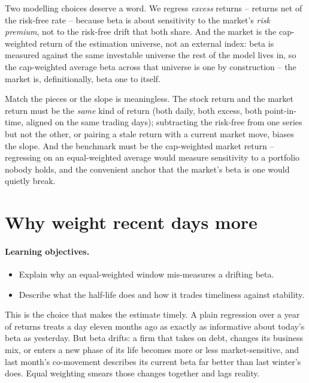 \documentclass[11pt]{article}
\theoremstyle{definition}
\theoremstyle{plain}
\theoremstyle{remark}
\begin{document}
Two modelling choices deserve a word. We regress \emph{excess} returns -- returns net of the risk-free rate -- because beta is about sensitivity to the market's \emph{risk premium}, not to the risk-free drift that both share. And the market is the cap-weighted return of the estimation universe, not an external index: beta is measured against the same investable universe the rest of the model lives in, so the cap-weighted average beta across that universe is one by construction -- the market is, definitionally, beta one to itself.

\begin{pitfall}
Match the pieces or the slope is meaningless. The stock return and the market return must be the \emph{same} kind of return (both daily, both excess, both point-in-time, aligned on the same trading days); subtracting the risk-free from one series but not the other, or pairing a stale return with a current market move, biases the slope. And the benchmark must be the cap-weighted market return -- regressing on an equal-weighted average would measure sensitivity to a portfolio nobody holds, and the convenient anchor that the market's beta is one would quietly break.
\end{pitfall}

\section{Why weight recent days more}\label{sec:halflife}

\paragraph{Learning objectives.}
\begin{itemize}[leftmargin=1.4em,topsep=2pt]
  \item Explain why an equal-weighted window mis-measures a drifting beta.
  \item Describe what the half-life does and how it trades timeliness against stability.
\end{itemize}

This is the choice that makes the estimate timely. A plain regression over a year of returns treats a day eleven months ago as exactly as informative about today's beta as yesterday. But beta drifts: a firm that takes on debt, changes its business mix, or enters a new phase of its life becomes more or less market-sensitive, and last month's co-movement describes its current beta far better than last winter's does. Equal weighting smears those changes together and lags reality.
\end{document}
